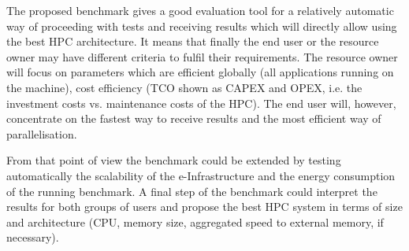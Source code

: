 The proposed benchmark gives a good evaluation tool for a relatively automatic way of proceeding with tests and receiving results which will directly allow using the best HPC architecture.  It means that finally the end user or the resource owner may have different criteria to fulfil their requirements. The resource owner will focus on parameters which are efficient globally (all applications running on the machine), cost efficiency (TCO shown as CAPEX and OPEX, i.e. the investment costs vs. maintenance costs of the HPC). The end user will, however, concentrate on the fastest way to receive results and the most efficient way of parallelisation.

From that point of view the benchmark could be extended by testing automatically
the scalability of the e-Infrastructure and the energy consumption of the running benchmark. A final step of the benchmark could interpret the results for both groups of users and propose the best HPC system in terms of size and architecture (CPU, memory size, aggregated speed to external memory, if necessary).
